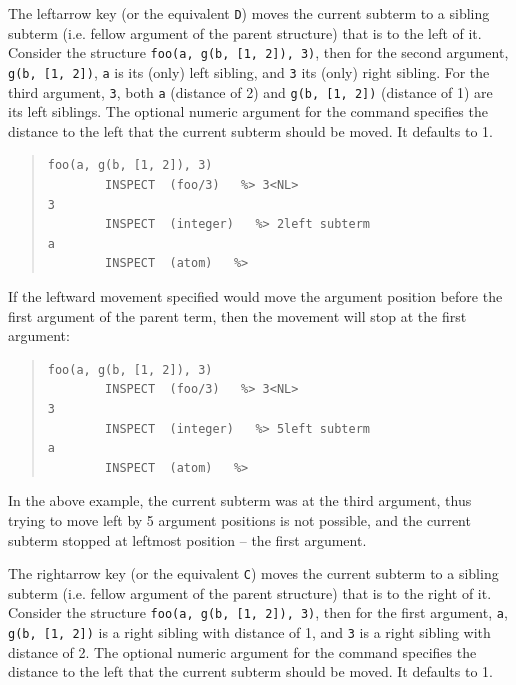 \begin{descr}{1cm}



The leftarrow key (or the equivalent \verb'D') moves the current subterm to
a sibling subterm (i.e. fellow argument of the parent structure) that is to
the left of it. Consider the structure \verb'foo(a, g(b, [1, 2]), 3)', then
for the second argument, \verb'g(b, [1, 2])', \verb'a' is its (only) left
sibling, and \verb'3' its (only) right sibling. For the third argument,
\verb'3', both \verb'a' (distance of 2) and
\verb'g(b, [1, 2])' (distance of 1) are its left siblings. The optional
numeric argument for the command specifies the distance to the left that
the current subterm should be moved. It defaults to 1.


\begin{quote}\begin{verbatim}
foo(a, g(b, [1, 2]), 3)
        INSPECT  (foo/3)   %> 3<NL>
3
        INSPECT  (integer)   %> 2left subterm
a
        INSPECT  (atom)   %> 
\end{verbatim}\end{quote}

If the leftward movement specified would move the argument position before the
first argument of the parent term, then the movement will stop at the first
argument:


\begin{quote}\begin{verbatim}
foo(a, g(b, [1, 2]), 3)
        INSPECT  (foo/3)   %> 3<NL>
3
        INSPECT  (integer)   %> 5left subterm
a
        INSPECT  (atom)   %> 
\end{verbatim}\end{quote}

In the above example, the current subterm was at the third argument, thus
trying to move left by 5 argument positions is not possible, and
the current subterm stopped at leftmost position -- the first argument.



The rightarrow key (or the equivalent \verb'C') moves the current subterm
to a sibling subterm (i.e. fellow argument of the parent structure) that is
to the right of it. Consider the structure \verb'foo(a, g(b, [1, 2]), 3)',
then for the first argument, \verb'a', \verb'g(b, [1, 2])' is a right
sibling with distance of 1, and \verb'3' is a right sibling with distance
of 2. The optional numeric argument for the command specifies the distance
to the left that the current subterm should be moved. It defaults to 1.


\end{descr}
